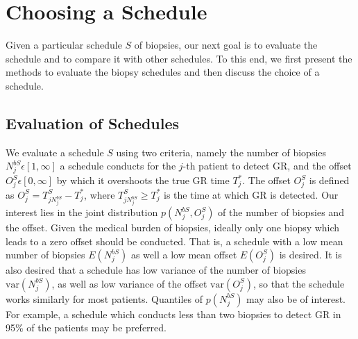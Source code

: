 
\section{Choosing a Schedule}
\label{sec : choosing_schedule}
Given a particular schedule $S$ of biopsies, our next goal is to evaluate the schedule and to compare it with other schedules. To this end, we first present the methods to evaluate the biopsy schedules and then discuss the choice of a schedule.

\subsection{Evaluation of Schedules}
We evaluate a schedule $S$ using two criteria, namely the number of biopsies $N^{bS}_j \epsilon [1, \infty]$ a schedule conducts for the $j$-th patient to detect GR, and the offset $O^S_j \epsilon [0, \infty]$ by which it overshoots the true GR time $T^*_j$. The offset $O^S_j$ is defined as $O^S_j = T^S_{j{N^{bS}_j}} - T^*_j$, where $T^S_{j{N^{bS}_j}} \geq T^*_j$ is the time at which GR is detected. Our interest lies in the joint distribution $p(N^{bS}_j, O^S_j)$ of the number of biopsies and the offset. Given the medical burden of biopsies, ideally only one biopsy which leads to a zero offset should be conducted. That is, a schedule with a low mean number of biopsies $E(N^{bS}_j)$ as well a low mean offset $E(O^S_j)$ is desired. It is also desired that a schedule has low variance of the number of biopsies $\mbox{var}(N^{bS}_j)$, as well as low variance of the offset $\mbox{var}(O^S_j)$, so that the schedule works similarly for most patients. Quantiles of $p(N^{bS}_j)$ may also be of interest. For example, a schedule which conducts less than two biopsies to detect GR in 95\% of the patients may be preferred.

